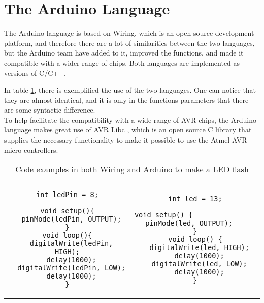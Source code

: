 \section{The Arduino Language}
The Arduino language is based on Wiring, which is an open source development platform, and therefore there are a lot of similarities between the two languages, but the Arduino team have added to it, improved the functions, and made it compatible with a wider range of chips. Both languages are implemented as versions of C/C++.

In table \ref{tabel:comparison}, there is exemplified the use of the two languages. One can notice that they are almost identical, and it is only in the functions parameters that there are some syntactic difference.\\ 
To help facilitate the compatibility with a wide range of AVR chips, the Arduino language makes great use of AVR Libc \cite{AVR:lib}, which is an open source C library that supplies the necessary functionality to make it possible to use the Atmel AVR micro controllers.\\

\begin{table}[H]\scriptsize
\centering
\begin{tabular}{cc}
\begin{minipage}{7cm}
\begin{lstlisting}[caption=Wiring]
int ledPin = 8;

void setup(){
  pinMode(ledPin, OUTPUT);
}
void loop(){
  digitalWrite(ledPin, HIGH);
  delay(1000);
  digitalWrite(ledPin, LOW);
  delay(1000);
}
\end{lstlisting} 
\end{minipage}
 
& 
\begin{minipage}{7cm}
\begin{lstlisting}[caption=Arduino]
int led = 13;

void setup() {                
  pinMode(led, OUTPUT);     
}
void loop() {
  digitalWrite(led, HIGH);
  delay(1000);
  digitalWrite(led, LOW);
  delay(1000);
}
\end{lstlisting}
\end{minipage}
 
\end{tabular} 
\caption{Code examples in both Wiring and Arduino to make a LED flash}
\label{tabel:comparison}
\end{table}

